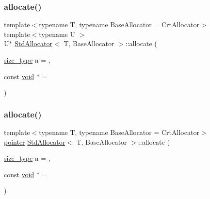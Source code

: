 \subsubsection{\texorpdfstring{allocate()}{allocate()}\hspace{0.1cm}{\footnotesize\ttfamily [1/2]}}
{\footnotesize\ttfamily template$<$typename T, typename Base\+Allocator = Crt\+Allocator$>$ \\
template$<$typename U $>$ \\
U$\ast$ \hyperlink{classStdAllocator}{Std\+Allocator}$<$ T, Base\+Allocator $>$\+::allocate (\begin{DoxyParamCaption}\item[{\hyperlink{classStdAllocator_af0b177dc293fe5b985ba9e27de23b2c1}{size\+\_\+type}}]{n = {},  }\item[{const \hyperlink{imgui__impl__opengl3__loader_8h_ac668e7cffd9e2e9cfee428b9b2f34fa7}{void} $\ast$}]{ = {} }\end{DoxyParamCaption})\hspace{0.3cm}{\ttfamily [inline]}}

\mbox{\label{classStdAllocator_aa301f003f6722d438834b377c314247e}} 
\subsubsection{\texorpdfstring{allocate()}{allocate()}\hspace{0.1cm}{\footnotesize\ttfamily [2/2]}}
{\footnotesize\ttfamily template$<$typename T, typename Base\+Allocator = Crt\+Allocator$>$ \\
\hyperlink{classStdAllocator_a0c970fb2525af736640f0ac3a29d45c5}{pointer} \hyperlink{classStdAllocator}{Std\+Allocator}$<$ T, Base\+Allocator $>$\+::allocate (\begin{DoxyParamCaption}\item[{\hyperlink{classStdAllocator_af0b177dc293fe5b985ba9e27de23b2c1}{size\+\_\+type}}]{n = {},  }\item[{const \hyperlink{imgui__impl__opengl3__loader_8h_ac668e7cffd9e2e9cfee428b9b2f34fa7}{void} $\ast$}]{ = {} }\end{DoxyParamCaption})\hspace{0.3cm}{\ttfamily [inline]}}

\mbox{\label{classStdAllocator_a279cb8367857b1263c4ab014b74f842a}} 
